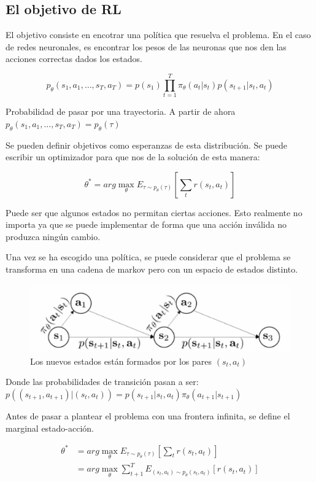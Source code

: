 \subsection{El objetivo de RL}%
\label{sub:el_objetivo_de_rl}

El objetivo consiste en encotrar una política que resuelva el problema. En el caso de redes
neuronales, es encontrar los pesos de las neuronas que nos den las acciones correctas dados los
estados.

\[
    p_\theta(s_1,a_1,\ldots,s_T,a_T)=p(s_1) \prod_{t=1}^T \pi_\theta
    (a_t|s_t)p(s_{t+1}|s_t,a_t)
\] 

Probabilidad de pasar por una trayectoria. A partir de ahora $p_\theta(s_1,a_1,\ldots,s_T,a_T)
= p_\theta(\tau)$ 

Se pueden definir objetivos como esperanzas de esta distribución. Se puede escribir un
optimizador para que nos de la solución de esta manera:

\[
    \theta^* =arg\max_\theta E_{\tau \sim p_\theta(\tau)}\left[\sum_t r(s_t, a_t)\right]
\] 

Puede ser que algunos estados no permitan ciertas acciones. Esto realmente no importa ya que se
puede implementar de forma que una acción inválida no produzca ningún cambio.

Una vez se ha escogido una política, se puede considerar que el problema se transforma en una
cadena de markov pero con un espacio de estados distinto.

\begin{figure}[htpb]
	\centering
    \includegraphics[width=0.8\linewidth]{figures/2020-06-12-190956_502x132_scrot.png}
    \caption{Los nuevos estados están formados por los pares $(s_t, a_t)$}
\end{figure}

Donde las probabilidades de transición pasan a ser:
$p((s_{t+1},a_{t+1})|(s_t,a_t))=p(s_{t+1}|s_t,a_t)\pi_\theta(a_{t+1}|s_{t+1})$

Antes de pasar a plantear el problema con una frontera infinita, se define el marginal
estado-acción.

\begin{align}
    \theta^* &=arg\max_\theta E_{\tau \sim p_\theta(\tau)}\left[\sum_t r(s_t, a_t)\right]\\
             &= arg\max_\theta \sum_{t+1}^{T}E_{(s_t,a_t)\sim p_\theta(s_t,a_t)}[r(s_t,a_t)]
\end{align}

